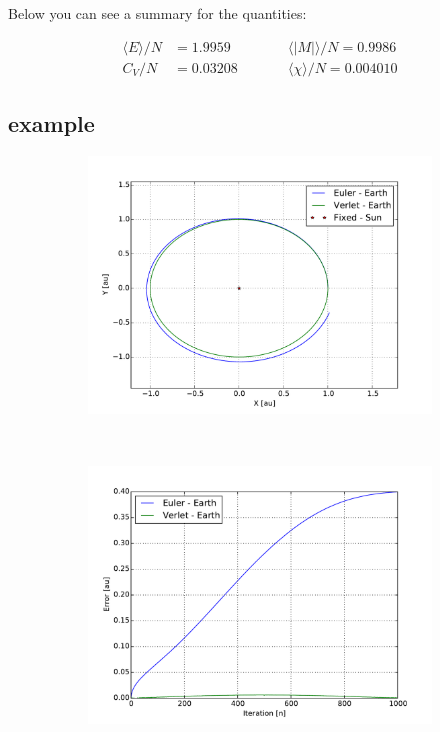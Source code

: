 Below you can see a summary for the quantities:

\begin{align*}
    \langle E \rangle /N &= 1.9959  \qquad &&\langle |M| \rangle /N = 0.9986
    \\
    C_V/N &= 0.03208  \qquad &&\langle \chi \rangle / N = 0.004010
\end{align*}









\pagebreak
\subsection{example}

\begin{figure}[H]
    \centering
    \begin{subfigure}{0.5\textwidth}
        \centering
        \includegraphics[width=\linewidth]{result/bilder/earth-sun.pdf}
    	\caption{}
    \end{subfigure}%
    ~ 
    \begin{subfigure}{0.5\textwidth}
        \centering
        \includegraphics[width=\linewidth]{result/bilder/earth-sun-error.pdf}

\end{subfigure}
\end{figure}
